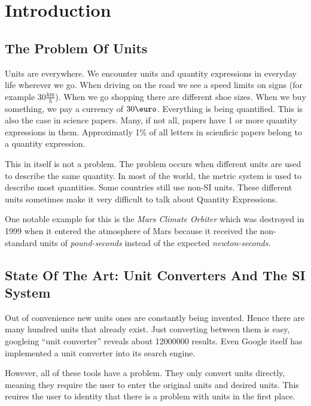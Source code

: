 \section{Introduction}

\subsection{The Problem Of Units}

Units are everywhere. We encounter units and quantity expressions in everyday life wherever we go. When driving on the road we see a speed limits on signs (for example $30 \frac{\text{km}}{h}$). When we go shopping there are different shoe sizes. When we buy something, we pay a currency of $30 \text{\euro}$. Everything is being quantified. This is also the case in science papers. Many, if not all, papers have 1 or more quantity expressions in them. Approximatly 1\% of all letters in scienficic papers belong to a quantity expression.

This in itself is not a problem. The problem occurs when different units are used to describe the same quantity. In most of the world, the metric system is used to describe most quantities. Some countries still use non-SI units. These different units sometimes make it very difficult to talk about Quantity Expressions.

One notable example for this is the \textit{Mars Climate Orbiter} which was destroyed in 1999 when it entered the atmosphere of Mars because it received the non-standard units of \textit{pound-seconds} instead of the expected \textit{newton-seconds}\cite{nasa:mcor}.

\subsection{State Of The Art: Unit Converters And The SI System}

Out of convenience new units ones are constantly being invented. Hence there are many hundred units that already exist. Just converting between them is easy, googleing ``unit converter'' reveals about 12000000 results. Even Google itself has implemented a unit converter into its search engine.

However, all of these tools have a problem. They only convert units directly, meaning they require the user to enter the original units and desired units. This reuires the user to identity that there is a problem with units in the first place.

